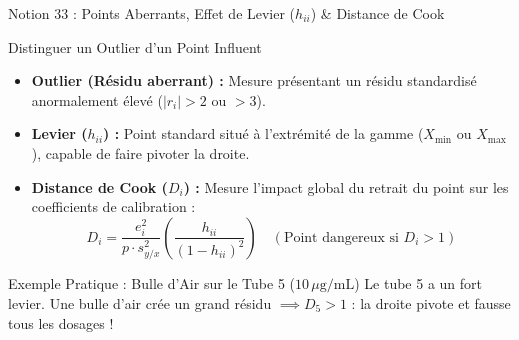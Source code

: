 \documentclass[aspectratio=169,10pt]{beamer}
\begin{document}
\begin{frame}{Notion 33 : Points Aberrants, Effet de Levier ($h_{ii}$) \& Distance de Cook}
  \begin{conceptbox}{Distinguer un Outlier d'un Point Influent}
    \footnotesize
    \begin{itemize}
      \item \textbf{Outlier (Résidu aberrant) :} Mesure présentant un résidu standardisé anormalement élevé ($|r_i| > 2$ ou $> 3$).
      \item \textbf{Levier ($h_{ii}$) :} Point standard situé à l'extrémité de la gamme ($X_{\min}$ ou $X_{\max}$), capable de faire pivoter la droite.
      \item \textbf{Distance de Cook ($D_i$) :} Mesure l'impact global du retrait du point sur les coefficients de calibration :
      \begin{equation*}
        D_i = \frac{e_i^2}{p \cdot s_{y/x}^2} \left(\frac{h_{ii}}{(1 - h_{ii})^2}\right) \quad (\text{Point dangereux si } D_i > 1)
      \end{equation*}
    \end{itemize}
  \end{conceptbox}
  \vspace{1mm}
  \begin{biobox}{Exemple Pratique : Bulle d'Air sur le Tube 5 ($10\,\mu\text{g/mL}$)}
    \footnotesize
    Le tube 5 a un fort levier. Une bulle d'air crée un grand résidu $\implies D_5 > 1$ : la droite pivote et fausse tous les dosages !
  \end{biobox}
\end{frame}
\end{document}
